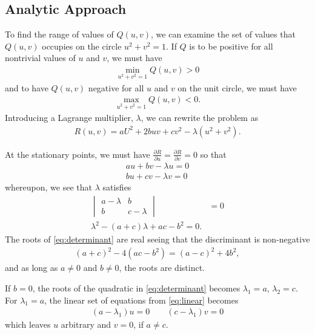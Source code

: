  \subsection{Analytic Approach}
%
To find the range of values of $Q(u,v)$, we can examine the set of values that $Q(u,v)$ occupies on the circle $u^2+v^2=1$. If $Q$ is to be positive for all nontrivial values of $u$ and $v$, we must have
%
\begin{align}
\min_{u^2+v^2=1} Q(u,v) > 0
\end{align}
%
and to have $Q(u,v)$ negative for all $u$ and $v$ on the unit circle, we must have
%
\begin{align}
\max_{u^2+v^2=1} Q(u,v) < 0.
\end{align}
%
Introducing a Lagrange multiplier, $\lambda$, we can rewrite the problem as 
%
\begin{align}
R(u,v) = aU^2 + 2buv + cv^2 - \lambda (u^2 + v^2).
\end{align}

At the stationary points, we must have $\frac{\partial R}{\partial u} = \frac{\partial R}{\partial v} = 0$ so that
%
\begin{align}
au + bv - \lambda u = 0 \nonumber \\
bu + cv - \lambda v = 0
\label{eq:linear}
\end{align}
%
whereupon, we see that $\lambda$ satisfies 
%
\begin{align}
\begin{vmatrix}
a - \lambda & b \\
%
b & c-\lambda
\end{vmatrix} &= 0 \\
%
\lambda^2 - (a+c)\lambda + ac - b^2 = 0.
\label{eq:determinant}
\end{align}
%
The roots of \eqref{eq:determinant} are real seeing that the discriminant is non-negative \ie 
%
\begin{align}
	\left(a+c\right)^2 - 4\left(ac-b^2\right) = \left(a-c\right)^2 + 4b^2,
\end{align}
%
and as long as $a\neq 0$ and $b \neq 0$, the roots are distinct. 

If $b=0$, the roots of the quadratic in \eqref{eq:determinant} becomes $\lambda_1 = a$, $\lambda_2=c$. For $\lambda_1 = a$, the linear set of equations from \eqref{eq:linear} becomes 
%
\begin{align}
	\left(a-\lambda_1\right) u = 0 \qquad \left(c-\lambda_1\right) v = 0
\end{align}
%
which leaves $u$ arbitrary and $v=0$, if $a\neq c$.

